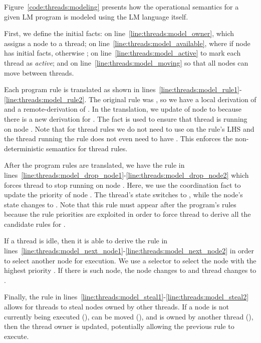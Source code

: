 Figure~\ref{code:threads:modeling} presents how the operational semantics for a
given LM program is modeled using the LM language itself.

First, we define the initial facts:  on
line~\ref{line:threads:model_owner}, which assigns a node to a thread;
 on line~\ref{line:threads:model_available}, where
 if node  has initial facts, otherwise ;
 on line~\ref{line:threads:model_active} to mark each thread as
\emph{active}; and  on line~\ref{line:threads:model_moving} so
that all nodes can move between threads.

Each program rule is translated as shown in
lines~\ref{line:threads:model_rule1}-\ref{line:threads:model_rule2}. The
original rule was , so we have a local derivation of  and a
remote-derivation of . In the translation, we update
 of node  to  because there is a new
derivation for . The fact  is used to ensure that
thread  is running on node . Note that for thread rules we do
not need to use  on the rule's LHS and the thread running
the rule does not even need to have . This enforces the
non-deterministic semantics for thread rules.

After the program rules are translated, we have the rule in
lines~\ref{line:threads:model_drop_node1}-\ref{line:threads:model_drop_node2}
which forces thread  to stop running on node . Here, we use the
coordination fact  to update the priority of node
. The thread's state switches to , while the node's state
changes to . Note that this rule must appear after the
program's rules because the rule priorities are exploited in order to force
thread  to derive all the candidate rules for .

If a thread is idle, then it is able to derive the rule in
lines~\ref{line:threads:model_next_node1}-\ref{line:threads:model_next_node2} in
order to select another node for execution. We use a  selector to
select the node  with the highest priority . If there is such
node, the node changes to  and thread  changes to
.

Finally, the rule in
lines~\ref{line:threads:model_steal1}-\ref{line:threads:model_steal2} allows for
threads to steal nodes owned by other threads. If a node is not currently being
executed (), can be moved (), and is owned by
another thread  (), then the thread owner is
updated, potentially allowing the previous rule to execute.

